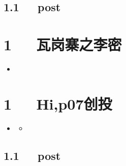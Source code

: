 \documentclass[letterpaper,12pt,english]{sphinxmanual}
\begin{document}
\section{1.1   post}
\label{\detokenize{p06_u5386_u53f2/Hello_uff0cp06_u5386_u53f2:post}}

\chapter{1   瓦岗寨之李密}
\label{\detokenize{p06_u5386_u53f2/_u74e6_u5c97_u5be8_u4e4b_u674e_u5bc6:id1}}\label{\detokenize{p06_u5386_u53f2/_u74e6_u5c97_u5be8_u4e4b_u674e_u5bc6::doc}}
\begin{sphinxShadowBox}
\begin{itemize}
\item {} 
\label{\detokenize{p06_u5386_u53f2/_u74e6_u5c97_u5be8_u4e4b_u674e_u5bc6:id3}}{\hyperref[\detokenize{p06_u5386_u53f2/_u74e6_u5c97_u5be8_u4e4b_u674e_u5bc6:id1}]{}}

\end{itemize}
\end{sphinxShadowBox}


\chapter{1   Hi,p07创投}
\label{\detokenize{p07_u521b_u6295/Hello_uff0cp07_u521b_u6295:hi-p07}}\label{\detokenize{p07_u521b_u6295/Hello_uff0cp07_u521b_u6295::doc}}
\begin{sphinxShadowBox}
\begin{itemize}
\item {} 
\label{\detokenize{p07_u521b_u6295/Hello_uff0cp07_u521b_u6295:id2}}{\hyperref[\detokenize{p07_u521b_u6295/Hello_uff0cp07_u521b_u6295:hi-p07}]{}}
\begin{itemize}
\item {} 
\label{\detokenize{p07_u521b_u6295/Hello_uff0cp07_u521b_u6295:id3}}{\hyperref[\detokenize{p07_u521b_u6295/Hello_uff0cp07_u521b_u6295:post}]{}}

\end{itemize}

\end{itemize}
\end{sphinxShadowBox}


\section{1.1   post}
\label{\detokenize{p07_u521b_u6295/Hello_uff0cp07_u521b_u6295:post}}
\end{document}
